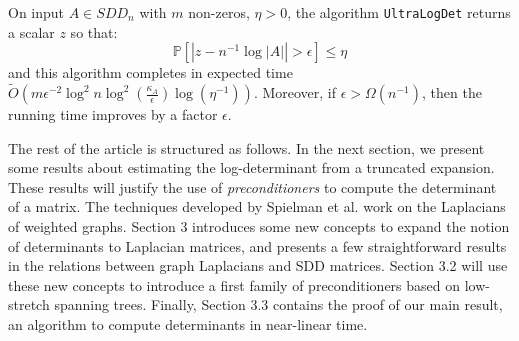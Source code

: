 \begin{theorem}\label{thm:ultra_main}On input $A\in SDD_{n}$ with
$m$ non-zeros, $\eta>0$, the algorithm \texttt{UltraLogDet} returns
a scalar $z$ so that: 
\[
\mathbb{P}\left[\left|z-n^{-1}\log\left|A\right|\right|>\epsilon\right]\leq\eta
\]
and this algorithm completes in expected time $\tilde{O}\left(m\epsilon^{-2}\log^{2}n\log^{2}\left(\frac{\kappa_{A}}{\epsilon}\right)\log\left(\eta^{-1}\right)\right)$.
Moreover, if $\epsilon>\Omega(n^{-1})$, then the running time improves
by a factor $\epsilon$.

\end{theorem}

The rest of the article is structured as follows. In the next section,
we present some results about estimating the log-determinant from
a truncated expansion. These results will justify the use of \emph{preconditioners
}to compute the determinant of a matrix. The techniques developed
by Spielman et al. work on the Laplacians of weighted graphs. Section
3 introduces some new concepts to expand the notion of determinants
to Laplacian matrices, and presents a few straightforward results
in the relations between graph Laplacians and SDD matrices. Section
3.2 will use these new concepts to introduce a first family of preconditioners
based on low-stretch spanning trees. Finally, Section 3.3 contains
the proof of our main result, an algorithm to compute determinants
in near-linear time. 
